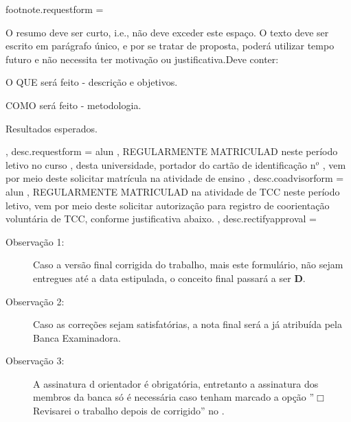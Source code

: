 {  %
 footnote.requestform       = { O resumo deve ser curto, i.e., não deve exceder este espaço. O texto deve ser escrito em parágrafo único, 
                                e por se tratar de proposta, poderá utilizar  tempo futuro e não necessita ter motivação ou justificativa.\break  Deve conter:
                                \begin{enumerate*}[alpha)] 
                                	\item O QUE será feito - descrição e objetivos.
                                   \item COMO será feito - metodologia.
                                	\item Resultados esperados.
                                \end{enumerate*}%
                                } ,   %
  desc.requestform          = {  alun , 
                              REGULARMENTE MATRICULAD neste período letivo no curso \emph{}, desta universidade, 
                              portador do cartão de identificação n$^o$ , 
                              vem por meio deste solicitar matrícula na atividade de ensino} ,
  desc.coadvisorform            = { alun , 
                              REGULARMENTE MATRICULAD na atividade de TCC neste período letivo, 
                              vem por meio deste solicitar autorização para registro de coorientação voluntária de TCC, conforme justificativa abaixo.} ,
  desc.rectifyapproval      = { \begin{description}
                              \item[Observação 1:] Caso a versão final corrigida do trabalho, mais este formulário, não sejam entregues até a data estipulada, o conceito final passará a ser {\bf D}.
                              \item[Observação 2:] Caso as correções sejam satisfatórias, a nota final será a já atribuída pela Banca Examinadora. 
                              \item[Observação 3:] A assinatura d orientador é obrigatória, entretanto a assinatura dos membros da banca só é necessária caso tenham marcado a opção ''$\Box$ Revisarei o trabalho depois de corrigido'' no \emph{}.

\end{description}}}
